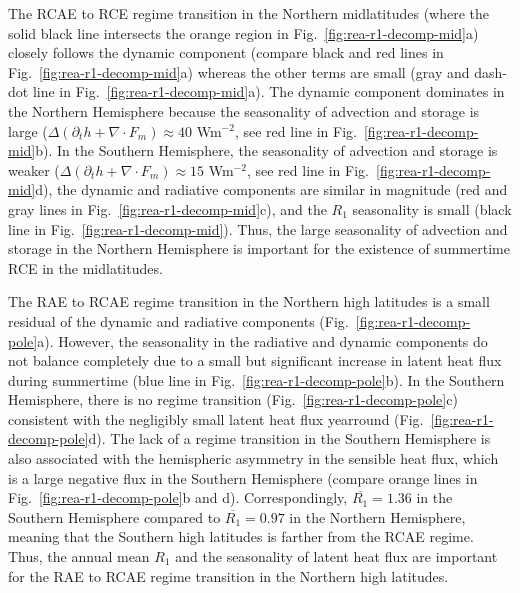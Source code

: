 \documentclass{ametsocV5}
\begin{document}
    The RCAE to RCE regime transition in the Northern midlatitudes (where the solid black line intersects the orange region in Fig.~\ref{fig:rea-r1-decomp-mid}a) closely follows the dynamic component (compare black and red lines in Fig.~\ref{fig:rea-r1-decomp-mid}a) whereas the other terms are small (gray and dash-dot line in Fig.~\ref{fig:rea-r1-decomp-mid}a). The dynamic component dominates in the Northern Hemisphere because the seasonality of advection and storage is large ($\Delta(\partial_t h + \nabla\cdot F_m)\approx 40$ Wm$^{-2}$, see red line in Fig.~\ref{fig:rea-r1-decomp-mid}b). In the Southern Hemisphere, the seasonality of advection and storage is weaker ($\Delta(\partial_t h + \nabla\cdot F_m)\approx 15$ Wm$^{-2}$, see red line in Fig.~\ref{fig:rea-r1-decomp-mid}d), the dynamic and radiative components are similar in magnitude (red and gray lines in Fig.~\ref{fig:rea-r1-decomp-mid}c), and the $R_1$ seasonality is small (black line in Fig.~\ref{fig:rea-r1-decomp-mid}). Thus, the large seasonality of advection and storage in the Northern Hemisphere is important for the existence of summertime RCE in the midlatitudes.

    The RAE to RCAE regime transition in the Northern high latitudes is a small residual of the dynamic and radiative components (Fig.~\ref{fig:rea-r1-decomp-pole}a). However, the seasonality in the radiative and dynamic components do not balance completely due to a small but significant increase in latent heat flux during summertime (blue line in Fig.~\ref{fig:rea-r1-decomp-pole}b). In the Southern Hemisphere, there is no regime transition (Fig.~\ref{fig:rea-r1-decomp-pole}c) consistent with the negligibly small latent heat flux yearround (Fig.~\ref{fig:rea-r1-decomp-pole}d). The lack of a regime transition in the Southern Hemisphere is also associated with the hemispheric asymmetry in the sensible heat flux, which is a large negative flux in the Southern Hemisphere (compare orange lines in Fig.~\ref{fig:rea-r1-decomp-pole}b and d). Correspondingly, $\overline{R_1}=1.36$ in the Southern Hemisphere compared to $\overline{R_1}=0.97$ in the Northern Hemisphere, meaning that the Southern high latitudes is farther from the RCAE regime. Thus, the annual mean $R_1$ and the seasonality of latent heat flux are important for the RAE to RCAE regime transition in the Northern high latitudes.
\end{document}
